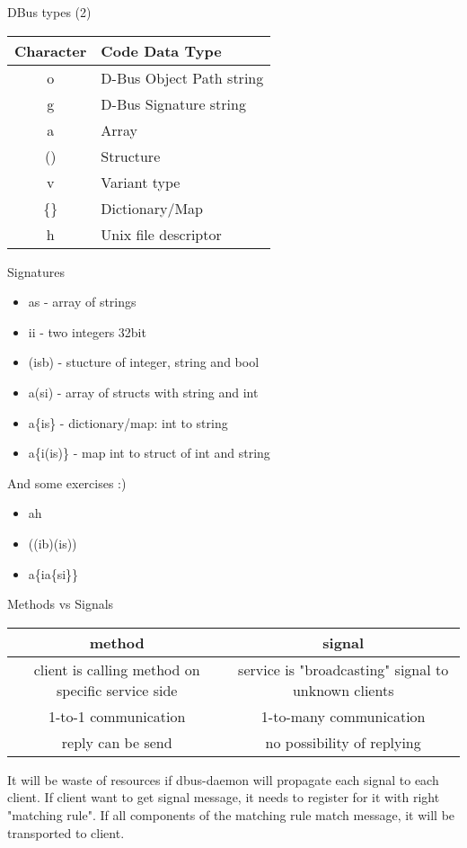 \documentclass{beamer}
\begin{document}
\begin{frame}{DBus types (2)}
  \begin{center}
    \begin{normalsize}
      \begin{tabulary}{1.0\textwidth}{|C|L|}
\hline
Character & Code Data Type\\
\hline
\hline
o & D-Bus Object Path string\\
\hline
g & D-Bus Signature string\\
\hline
a & Array\\
\hline
() & Structure\\
\hline
v & Variant type\\
\hline
\{\} & Dictionary/Map\\
\hline
h &Unix file descriptor\\
\hline
      \end{tabulary}
    \end{normalsize}
  \end{center}
\end{frame}

\begin{frame}{Signatures}
  \begin{itemize}
    \item as - array of strings
    \item ii - two integers 32bit
    \item (isb) - stucture of integer, string and bool
    \item a(si) - array of structs with string and int
    \item a\{is\} - dictionary/map: int to string
    \item a\{i(is)\} - map int to struct of int and string
  \end{itemize}
  \vfill
  \pause
  \begin{exampleblock}{And some exercises :)}
    \begin{itemize}
      \item ah
      \item ((ib)(is))
      \item a\{ia\{si\}\}
    \end{itemize}
  \end{exampleblock}
\end{frame}

\begin{frame}{Methods vs Signals}
\begin{tabulary}{1.0\textwidth}{|C|C|}
\hline
method & signal\\
\hline
\hline
client is calling method on specific service side & service is "broadcasting" signal to unknown clients\\
-to-1 communication & 1-to-many communication\\
\hline
reply can be send & no possibility of replying\\
\hline
\end{tabulary}
\vfill
\pause
It will be waste of resources if dbus-daemon will propagate each signal to each client. If client want to get signal message, it needs to register for it with right "matching rule". If all components of the matching rule match message, it will be transported to client.
\end{frame}
\end{document}
